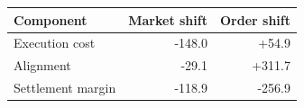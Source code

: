 \begin{tabular}{lrr}
\toprule
Component & Market shift & Order shift \\
\midrule
Execution cost & -148.0 & +54.9 \\
Alignment & -29.1 & +311.7 \\
Settlement margin & -118.9 & -256.9 \\
\bottomrule
\end{tabular}

